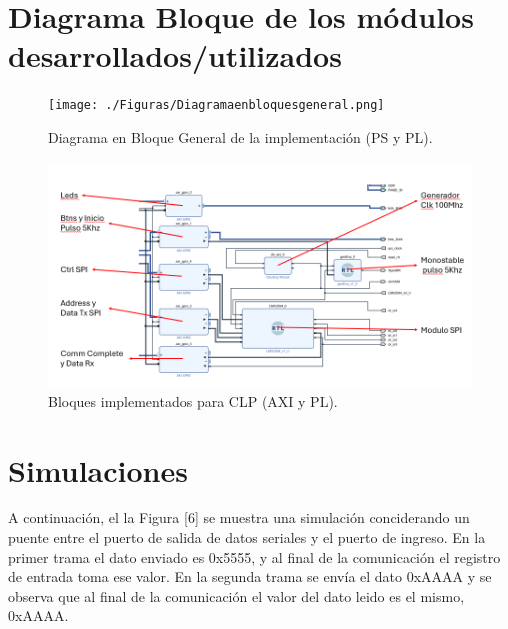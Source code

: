 \documentclass[
11pt, %
]{charter}
\begin{document}
\vspace{25px}

\section{Diagrama Bloque de los módulos desarrollados/utilizados}
\label{sec:org307bb59}

\begin{figure}[htpb]
\centering 
\texttt{[image: ./Figuras/Diagramaenbloquesgeneral.png]}
\caption{Diagrama en Bloque General de la implementación (PS y PL).}
\label{fig:diagBloques}
\end{figure}

\vspace{25px}

\begin{figure}[htpb]
\centering 
\includegraphics[width=.95\textwidth]{./Figuras/Descripciónbloques.png}
\caption{Bloques implementados para CLP (AXI y PL).}
\label{fig:diagBloques}
\end{figure}

\vspace{25px}


\section{Simulaciones}
\label{sec:org49fe900}

A continuación, el la Figura [6] se muestra una simulación conciderando un puente entre el puerto de salida de datos seriales y el puerto de ingreso.
En la primer trama el dato enviado es 0x5555, y al final de la comunicación el registro de entrada toma ese valor. En la segunda trama se envía el dato 0xAAAA y se observa que al final de la comunicación el valor del dato leido es el mismo, 0xAAAA.
\end{document}
